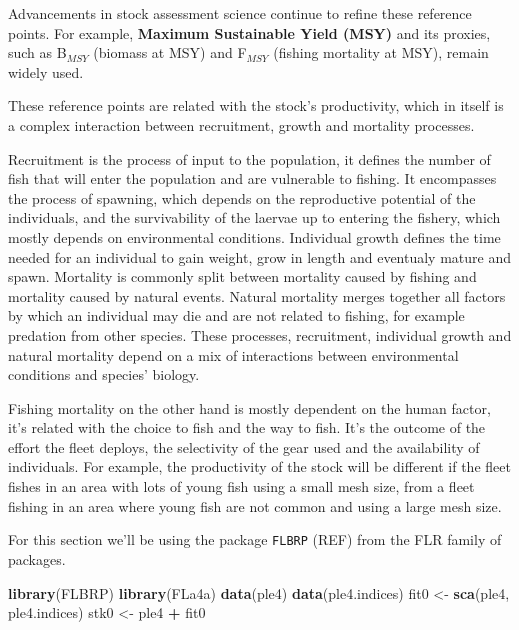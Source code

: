 \documentclass[
]{book}
\newenvironment{Shaded}{\begin{snugshade}}{\end{snugshade}}
\newcommand{\FunctionTok}[1]{\textcolor[rgb]{0.13,0.29,0.53}{\textbf{#1}}}
\newcommand{\NormalTok}[1]{#1}
\newcommand{\OtherTok}[1]{\textcolor[rgb]{0.56,0.35,0.01}{#1}}
\newcommand{\SpecialCharTok}[1]{\textcolor[rgb]{0.81,0.36,0.00}{\textbf{#1}}}
\begin{document}
Advancements in stock assessment science continue to refine these reference points. For example, \textbf{Maximum Sustainable Yield (MSY)} and its proxies, such as B\(_{MSY}\) (biomass at MSY) and F\(_{MSY}\) (fishing mortality at MSY), remain widely used.

These reference points are related with the stock's productivity, which in itself is a complex interaction between recruitment, growth and mortality processes.

Recruitment is the process of input to the population, it defines the number of fish that will enter the population and are vulnerable to fishing. It encompasses the process of spawning, which depends on the reproductive potential of the individuals, and the survivability of the laervae up to entering the fishery, which mostly depends on environmental conditions. Individual growth defines the time needed for an individual to gain weight, grow in length and eventualy mature and spawn. Mortality is commonly split between mortality caused by fishing and mortality caused by natural events. Natural mortality merges together all factors by which an individual may die and are not related to fishing, for example predation from other species. These processes, recruitment, individual growth and natural mortality depend on a mix of interactions between environmental conditions and species' biology.

Fishing mortality on the other hand is mostly dependent on the human factor, it's related with the choice to fish and the way to fish. It's the outcome of the effort the fleet deploys, the selectivity of the gear used and the availability of individuals. For example, the productivity of the stock will be different if the fleet fishes in an area with lots of young fish using a small mesh size, from a fleet fishing in an area where young fish are not common and using a large mesh size.

For this section we'll be using the package \texttt{FLBRP} (REF) from the FLR family of packages.

\begin{Shaded}
\begin{Highlighting}[]
\FunctionTok{library}\NormalTok{(FLBRP)}
\FunctionTok{library}\NormalTok{(FLa4a)}
\FunctionTok{data}\NormalTok{(ple4)}
\FunctionTok{data}\NormalTok{(ple4.indices)}
\NormalTok{fit0 }\OtherTok{\textless{}{-}} \FunctionTok{sca}\NormalTok{(ple4, ple4.indices)}
\NormalTok{stk0 }\OtherTok{\textless{}{-}}\NormalTok{ ple4 }\SpecialCharTok{+}\NormalTok{ fit0}
\end{Highlighting}
\end{Shaded}
\end{document}
